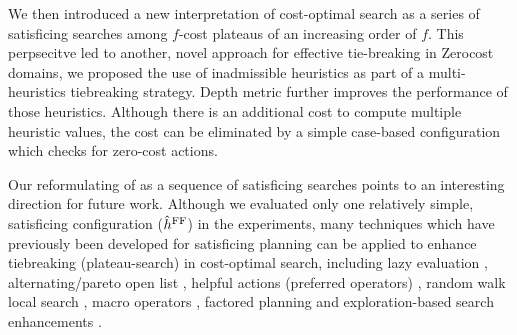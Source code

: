 We then introduced a new interpretation of cost-optimal \astar search as a series of satisficing
       searches among $f$-cost plateaus of an increasing order of $f$. 
This perpsecitve led to another, novel approach for effective tie-breaking in Zerocost domains, we proposed the use of
       inadmissible heuristics as part of a multi-heuristics tiebreaking strategy.
       Depth metric further improves the performance of those
       heuristics. Although there is an additional cost to compute
       multiple heuristic values, the cost can be eliminated by a simple
       case-based configuration which checks for zero-cost actions.

Our reformulating of \astar as a sequence of satisficing searches  points to  an interesting direction for future work.
Although we evaluated only one relatively simple, satisficing configuration ($\hat{h}^{\text{FF}}$) in
the experiments, many techniques which have previously been developed for satisficing planning can be applied to enhance tiebreaking (plateau-search) in cost-optimal search, including
lazy evaluation \cite{richter2010lama}, alternating/pareto open
list \cite{RogerH10}, helpful actions (preferred operators) \cite{Hoffmann01},
random walk local search \cite{nakhost2009monte}, macro operators
\cite{Botea2005,ChrpaVM15}, factored planning
\cite{amir2003factored,brafman2006factored,Asai2015} and
exploration-based search enhancements
\cite{valenzano2014comparison,xie14type,Valenzano2016}.

